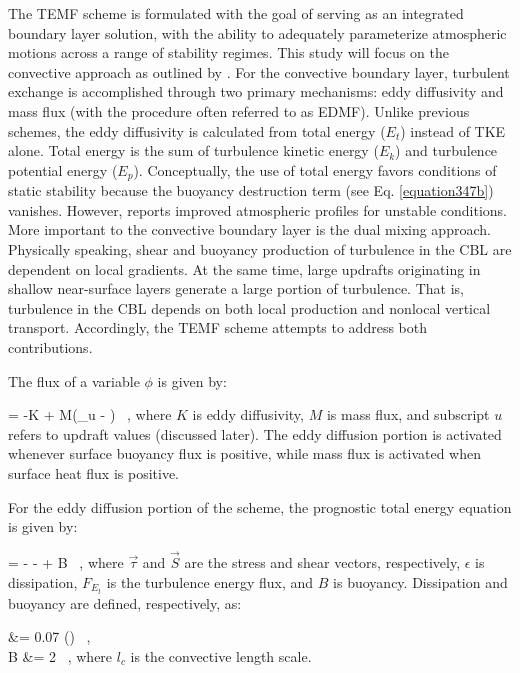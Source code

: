The TEMF scheme is formulated with the goal of serving as an integrated boundary layer solution, with the ability to adequately parameterize atmospheric motions across a range of stability regimes. This study will focus on the convective approach as outlined by  \citet{Angevine2010}. For the convective boundary layer, turbulent exchange is accomplished through two primary mechanisms: eddy diffusivity and mass flux (with the procedure often referred to as EDMF). Unlike previous schemes, the eddy diffusivity is calculated from total energy ($E_t$) instead of TKE alone. Total energy is the sum of turbulence kinetic energy ($E_k$) and turbulence potential energy ($E_p$). Conceptually, the use of total energy favors conditions of static stability because the buoyancy destruction term (see Eq. \autoref{equation347b}) vanishes. However,  \citet{Angevine2010} reports improved atmospheric profiles for unstable conditions.
More important to the convective boundary layer is the dual mixing approach. Physically speaking, shear and buoyancy production of turbulence in the CBL are dependent on local gradients. At the same time, large updrafts originating in shallow near-surface layers generate a large portion of turbulence. That is, turbulence in the CBL depends on both local production and nonlocal vertical transport. Accordingly, the TEMF scheme attempts to address both contributions. 

The flux of a variable $\phi$ is given by:

\be 
{} = -K + M(\phi_u - \phi) \, , \label{equation356}
\ee
\noindent
 where $K$ is eddy diffusivity, $M$ is mass flux, and subscript $u$ refers to updraft values (discussed later). The eddy diffusion portion is activated whenever surface buoyancy flux is positive, while mass flux is activated when surface heat flux is positive. 

For the eddy diffusion portion of the scheme, the prognostic total energy equation is given by:

\be
{} = \vec{\tau} \cdot {} - \epsilon -  + B \mbox { ,} \label{equation357}
\ee
\noindent
 where $\vec{\tau}$ and $\vec{S}$ are the stress and shear vectors, respectively, $\epsilon$ is dissipation, $F_{E_t}$ is the turbulence energy flux, and $B$ is buoyancy. Dissipation and buoyancy are defined, respectively, as:

\bse \label{equation358}
\bal
\epsilon &= 0.07 \left(\right) \, , \label{equation358a} \\
B &= 2  \label{equation358b} \, ,
\eal
\ese
\noindent
 where $l_c$ is the convective length scale.

